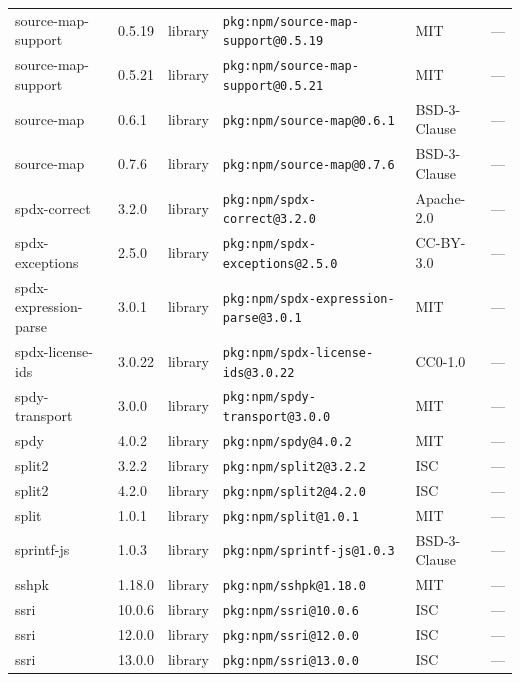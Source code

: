 \documentclass[11pt,a4paper]{article}
\begin{document}
\begin{longtable}{|p{4cm}|p{2cm}|p{1.6cm}|p{5cm}|p{1.5cm}|p{3.5cm}|}
\raggedright source-map-support & 0.5.19 & library & \small\texttt{pkg:npm/source-map-support@0.5.19} & MIT & \small — \\
\raggedright source-map-support & 0.5.21 & library & \small\texttt{pkg:npm/source-map-support@0.5.21} & MIT & \small — \\
\raggedright source-map & 0.6.1 & library & \small\texttt{pkg:npm/source-map@0.6.1} & BSD-3-Clause & \small — \\
\raggedright source-map & 0.7.6 & library & \small\texttt{pkg:npm/source-map@0.7.6} & BSD-3-Clause & \small — \\
\raggedright spdx-correct & 3.2.0 & library & \small\texttt{pkg:npm/spdx-correct@3.2.0} & Apache-2.0 & \small — \\
\raggedright spdx-exceptions & 2.5.0 & library & \small\texttt{pkg:npm/spdx-exceptions@2.5.0} & CC-BY-3.0 & \small — \\
\raggedright spdx-expression-parse & 3.0.1 & library & \small\texttt{pkg:npm/spdx-expression-parse@3.0.1} & MIT & \small — \\
\raggedright spdx-license-ids & 3.0.22 & library & \small\texttt{pkg:npm/spdx-license-ids@3.0.22} & CC0-1.0 & \small — \\
\raggedright spdy-transport & 3.0.0 & library & \small\texttt{pkg:npm/spdy-transport@3.0.0} & MIT & \small — \\
\raggedright spdy & 4.0.2 & library & \small\texttt{pkg:npm/spdy@4.0.2} & MIT & \small — \\
\raggedright split2 & 3.2.2 & library & \small\texttt{pkg:npm/split2@3.2.2} & ISC & \small — \\
\raggedright split2 & 4.2.0 & library & \small\texttt{pkg:npm/split2@4.2.0} & ISC & \small — \\
\raggedright split & 1.0.1 & library & \small\texttt{pkg:npm/split@1.0.1} & MIT & \small — \\
\raggedright sprintf-js & 1.0.3 & library & \small\texttt{pkg:npm/sprintf-js@1.0.3} & BSD-3-Clause & \small — \\
\raggedright sshpk & 1.18.0 & library & \small\texttt{pkg:npm/sshpk@1.18.0} & MIT & \small — \\
\raggedright ssri & 10.0.6 & library & \small\texttt{pkg:npm/ssri@10.0.6} & ISC & \small — \\
\raggedright ssri & 12.0.0 & library & \small\texttt{pkg:npm/ssri@12.0.0} & ISC & \small — \\
\raggedright ssri & 13.0.0 & library & \small\texttt{pkg:npm/ssri@13.0.0} & ISC & \small — \\

\end{longtable}
\end{document}
